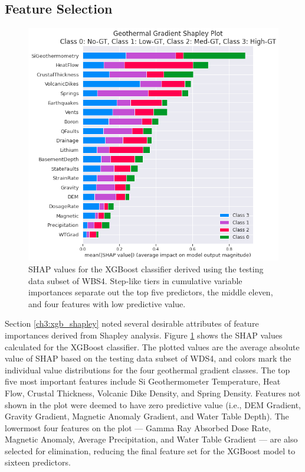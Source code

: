 \subsection{Feature Selection}\label{ch5:xgb_feature_selection}
\begin{figure}%
\centering
\includegraphics[width=\textwidth]{templates/images/Figure-Shapley.png}
\caption[XGBoost SHAP values]{SHAP values for the XGBoost classifier derived using the testing data subset of WBS4. Step-like tiers in cumulative variable importances separate out the top five predictors, the middle eleven, and four features with low predictive value.}
\label{fig:xgb_shap_global}
\end{figure}
Section \ref{ch3:xgb_shapley} noted several desirable attributes of feature importances derived from Shapley analysis. Figure \ref{fig:xgb_shap_global} shows the SHAP values calculated for the XGBoost classifier. The plotted values are the average absolute value of SHAP based on the testing data subset of WDS4, and colors mark the individual value distributions for the four geothermal gradient classes. The top five most important features include Si Geothermometer Temperature, Heat Flow, Crustal Thickness, Volcanic Dike Density, and Spring Density.  Features not shown in the plot were deemed to have zero predictive value (i.e., DEM Gradient, Gravity Gradient, Magnetic Anomaly Gradient, and Water Table Depth). The lowermost four features on the plot --- Gamma Ray Absorbed Dose Rate, Magnetic Anomaly, Average Precipitation, and Water Table Gradient --- are also selected for elimination, reducing the final feature set for the XGBoost model to sixteen predictors.

